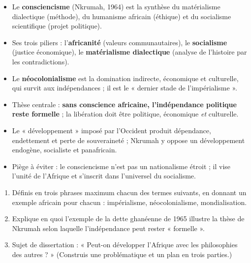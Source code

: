 \documentclass[11pt]{article}
\begin{document}
\begin{aretenir}
\begin{itemize}
\item Le \textbf{consciencisme} (Nkrumah, 1964) est la synthèse du matérialisme dialectique (méthode), du humanisme africain (éthique) et du socialisme scientifique (projet politique).
\item Ses trois piliers : l'\textbf{africanité} (valeurs communautaires), le \textbf{socialisme} (justice économique), le \textbf{matérialisme dialectique} (analyse de l'histoire par les contradictions).
\item Le \textbf{néocolonialisme} est la domination indirecte, économique et culturelle, qui survit aux indépendances ; il est le « dernier stade de l'impérialisme ».
\item Thèse centrale : \textbf{sans conscience africaine, l'indépendance politique reste formelle} ; la libération doit être politique, économique \emph{et} culturelle.
\item Le « développement » imposé par l'Occident produit dépendance, endettement et perte de souveraineté ; Nkrumah y oppose un développement endogène, socialiste et panafricain.
\item Piège à éviter : le consciencisme n'est pas un nationalisme étroit ; il vise l'unité de l'Afrique et s'inscrit dans l'universel du socialisme.
\end{itemize}
\end{aretenir}

\begin{exercice}
\begin{enumerate}
\item Définis en trois phrases maximum chacun des termes suivants, en donnant un exemple africain pour chacun : impérialisme, néocolonialisme, mondialisation.
\item Explique en quoi l'exemple de la dette ghanéenne de 1965 illustre la thèse de Nkrumah selon laquelle l'indépendance peut rester « formelle ».
\item Sujet de dissertation : « Peut-on développer l'Afrique avec les philosophies des autres ? » (Construis une problématique et un plan en trois parties.)
\end{enumerate}
\end{exercice}
\end{document}
